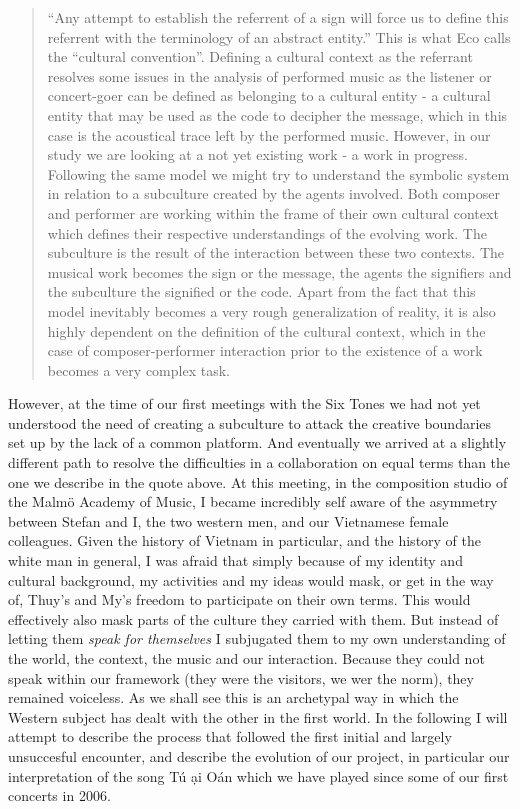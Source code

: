 \documentclass[a4paper]{article}
\begin{document}
\begin{quote}
  ``Any attempt to establish the referrent of a sign will force us to define this referrent with   the terminology of an abstract entity.'' This is what Eco calls the ``cultural convention''.   \cite[pp. 61-6]{eco71} Defining a cultural context as the referrant resolves some issues in   the analysis of performed music as the listener or concert-goer can be defined as belonging to   a cultural entity - a cultural entity that may be used as the code to decipher the message,   which in this case is the acoustical trace left by the performed music. However, in our study   we are looking at a not yet existing work - a work in progress. Following the same model we   might try to understand the symbolic system in relation to a subculture created by the agents   involved.  Both composer and performer are working within the frame of their own cultural   context which defines their respective understandings of the evolving work. The subculture is   the result of the interaction between these two contexts. The musical work becomes the sign or   the message, the agents the signifiers and the subculture the signified or the code. Apart   from the fact that this model inevitably becomes a very rough generalization     of reality, it is also highly dependent on the definition of the cultural context, which in   the case of composer-performer interaction prior to the existence of a work becomes a very   complex task.  \citep{frisk-ost06-2}
\end{quote}

However, at the time of our first meetings with the Six Tones we had not yet understood the need of creating a subculture to attack the creative boundaries set up by the lack of a common platform. And eventually we arrived at a slightly different path to resolve the difficulties in a collaboration on  equal terms than the one we describe in the quote above. At this meeting, in the composition studio of the Malmö Academy of Music, I became incredibly self aware of the asymmetry between Stefan and I, the two western men, and our Vietnamese female colleagues. Given the history of Vietnam in particular, and the history of the white man in general, I was afraid that simply because of my identity and cultural background, my activities and my ideas would mask, or get in the way of, Thuy's and My's freedom to participate on their own terms. This would effectively also mask parts of the culture they carried with them. But instead of letting them \emph{speak for themselves} I subjugated them to my own understanding of the world, the context, the music and our interaction. Because they could not speak within our framework (they were the visitors, we wer the norm), they remained voiceless. As we shall see this is an archetypal way in which the Western subject has dealt with the other in the first world. In the following I will attempt to describe the process that followed the first initial and largely unsuccesful encounter, and describe the evolution of our project, in particular our interpretation of the song T\'{u} \DH \d{a}i O\'{a}n which we have played since some of our first concerts in 2006. 
\end{document}
